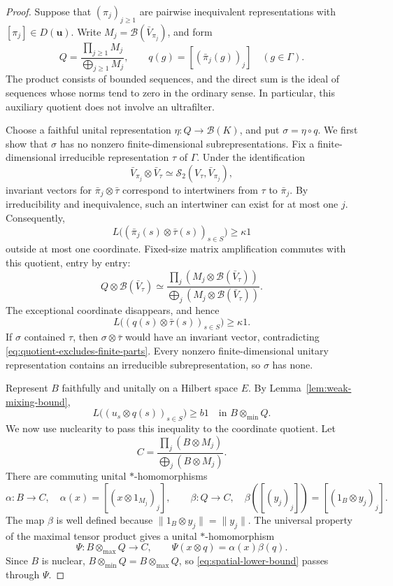 \begin{proof}
Suppose that $(\pi_j)_{j\geq1}$ are pairwise inequivalent representations
with $[\pi_j]\in D(\mathbf u)$. Write $M_j=\mathcal B(\bar V_{\pi_j})$, and form
\[
 Q=\frac{\prod_{j\geq1}M_j}{\bigoplus_{j\geq1}M_j},
 \qquad q(g)=[(\bar\pi_j(g))_j]\quad(g\in\Gamma).
\]
The product consists of bounded sequences, and the direct sum is the ideal
of sequences whose norms tend to zero in the ordinary sense. In
particular, this auxiliary quotient does not involve an ultrafilter.

Choose a faithful unital representation $\eta:Q\to\mathcal B(K)$, and
put $\sigma=\eta\circ q$. We first show that $\sigma$ has no nonzero
finite-dimensional subrepresentations. Fix a
finite-dimensional irreducible representation $\tau$ of $\Gamma$.
Under the identification
\[
 \bar V_{\pi_j}\otimes\bar V_\tau
 \simeq\mathcal S_2(V_\tau,\bar V_{\pi_j}),
\]
invariant vectors for $\bar\pi_j\otimes\bar\tau$ correspond to
intertwiners from $\tau$ to $\bar\pi_j$. By irreducibility and
inequivalence, such an intertwiner can exist for at most one $j$.
Consequently,
\[
 L\bigl((\bar\pi_j(s)\otimes\bar\tau(s))_{s\in S}\bigr)
 \geq\kappa1
\]
outside at most one coordinate. Fixed-size matrix amplification commutes
with this quotient, entry by entry:
\[
 Q\otimes\mathcal B(\bar V_\tau)
 \simeq
 \frac{\prod_j(M_j\otimes\mathcal B(\bar V_\tau))}
 {\bigoplus_j(M_j\otimes\mathcal B(\bar V_\tau))}.
\]
The exceptional coordinate disappears, and hence
\begin{equation}\label{eq:quotient-excludes-finite-parts}
 L\bigl((q(s)\otimes\bar\tau(s))_{s\in S}\bigr)\geq\kappa1.
\end{equation}
If $\sigma$ contained $\tau$, then
$\sigma\otimes\bar\tau$ would have an invariant vector, contradicting
\eqref{eq:quotient-excludes-finite-parts}. Every nonzero finite-dimensional
unitary representation contains an irreducible subrepresentation, so
$\sigma$ has none.

Represent $B$ faithfully and unitally on a Hilbert space $E$. By
Lemma~\ref{lem:weak-mixing-bound},
\begin{equation}\label{eq:spatial-lower-bound}
 L\bigl((u_s\otimes q(s))_{s\in S}\bigr)\geq b1
 \quad\text{in }B\otimes_{\min}Q.
\end{equation}
We now use nuclearity to pass this inequality to the coordinate quotient.
Let
\[
 C=\frac{\prod_j(B\otimes M_j)}{\bigoplus_j(B\otimes M_j)}.
\]
There are commuting unital $*$-homomorphisms
\[
 \alpha:B\longrightarrow C,\quad
 \alpha(x)=[(x\otimes1_{M_j})_j],
 \qquad
 \beta:Q\longrightarrow C,\quad
 \beta([(y_j)_j])=[(1_B\otimes y_j)_j].
\]
The map $\beta$ is well defined because
$\|1_B\otimes y_j\|=\|y_j\|$. The universal property of the maximal
tensor product gives a unital $*$-homomorphism
\[
 \Psi:B\otimes_{\max}Q\longrightarrow C,
 \qquad \Psi(x\otimes q)=\alpha(x)\beta(q).
\]
Since $B$ is nuclear,
$B\otimes_{\min}Q=B\otimes_{\max}Q$, so \eqref{eq:spatial-lower-bound}
passes through $\Psi$.


\end{proof}
